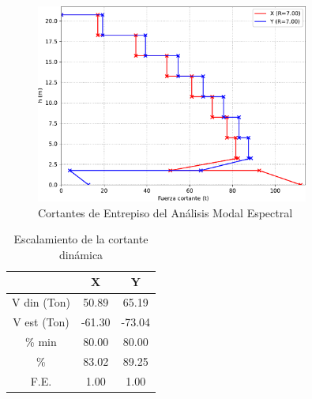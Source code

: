 \documentclass{article}%
\begin{document}
\begin{figure}[ht!]%
\includegraphics[width=0.8\textwidth]{images/cortantes}%
\caption{Cortantes de Entrepiso del Análisis Modal Espectral}%
\label{fig:corte_basal}%
\end{figure}

%


\begin{table}[H]%
\centering%
\caption{Escalamiento de la cortante dinámica}%
\begin{tabular}{ccc}
\toprule
 & X & Y \\
\midrule
V din (Ton) & 50.89 & 65.19 \\
V est (Ton) & -61.30 & -73.04 \\
\% min & 80.00 & 80.00 \\
\% & 83.02 & 89.25 \\
F.E. & 1.00 & 1.00 \\
\bottomrule
\end{tabular}
%
\end{table}

%
\end{document}
